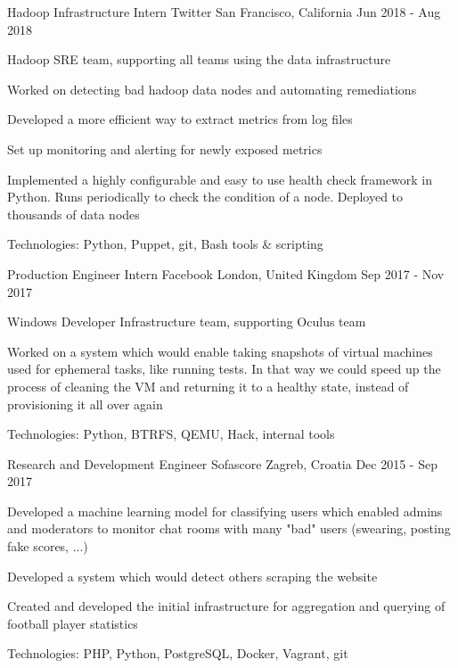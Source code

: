 \begin{cventries}
  \cventry
    {Hadoop Infrastructure Intern} %
    {Twitter} %
    {San Francisco, California} %
    {Jun 2018 - Aug 2018} %
    {
      \begin{cvitems} %
        \item {Hadoop SRE team, supporting all teams using the data infrastructure}
        \item {Worked on detecting bad hadoop data nodes and automating remediations}
        \item {Developed a more efficient way to extract metrics from log files}
        \item {Set up monitoring and alerting for newly exposed metrics}
        \item {Implemented a highly configurable and easy to use health check framework in Python. Runs periodically to check the condition of a node. Deployed to thousands of data nodes}
        \item {Technologies: Python, Puppet, git, Bash tools \& scripting}
      \end{cvitems}
    }

  \cventry
    {Production Engineer Intern} %
    {Facebook} %
    {London, United Kingdom} %
    {Sep 2017 - Nov 2017} %
    {
      \begin{cvitems} %
        \item {Windows Developer Infrastructure team, supporting Oculus team}
        \item {Worked on a system which would enable taking snapshots of virtual machines used for ephemeral tasks, like running tests. In that way we could speed up the process of cleaning the VM and returning it to a healthy state, instead of provisioning it all over again}
        \item {Technologies: Python, BTRFS, QEMU, Hack, internal tools}
      \end{cvitems}
    }

  \cventry
    {Research and Development Engineer} %
    {Sofascore} %
    {Zagreb, Croatia} %
    {Dec 2015 - Sep 2017} %
    {
      \begin{cvitems} %
        \item {Developed a machine learning model for classifying users which enabled admins and moderators to monitor chat rooms with many "bad" users (swearing, posting fake scores, ...)}
        \item {Developed a system which would detect others scraping the website}
        \item {Created and developed the initial infrastructure for aggregation and querying of football player statistics}
        \item {Technologies: PHP, Python, PostgreSQL, Docker, Vagrant, git}
      \end{cvitems}
    }


\end{cventries}

